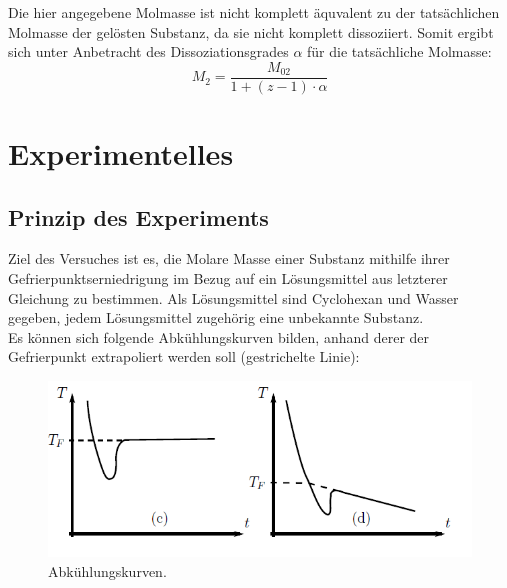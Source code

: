 \documentclass[12pt,a4paper,titlepage,headinclude,bibtotoc]{scrartcl}
\begin{document}


Die hier angegebene Molmasse ist nicht komplett äquvalent zu der tatsächlichen Molmasse der gelösten Substanz, da sie nicht komplett dissoziiert. Somit ergibt sich unter Anbetracht des Dissoziationsgrades $\alpha$ für die tatsächliche Molmasse: \\

\begin{equation}
M_2 = \frac{M_\mathrm{02}}{1+(z-1) \cdot \alpha}
\end{equation}

\section{Experimentelles}
\subsection{Prinzip des Experiments}

Ziel des Versuches ist es, die Molare Masse einer Substanz mithilfe ihrer Gefrierpunktserniedrigung im Bezug auf ein Lösungsmittel aus letzterer Gleichung zu bestimmen. Als Lösungsmittel sind Cyclohexan und Wasser gegeben, jedem Lösungsmittel zugehörig eine unbekannte Substanz.\\
Es können sich folgende Abkühlungskurven bilden, anhand derer der Gefrierpunkt extrapoliert werden soll (gestrichelte Linie): 

\begin{figure} [h!]
\begin{center}
\includegraphics[scale=0.8]{Abkuhlungskurven.png} \end{center}
\caption {Abkühlungskurven. \protect\footnotemark}
\end{figure}
\end{document}
